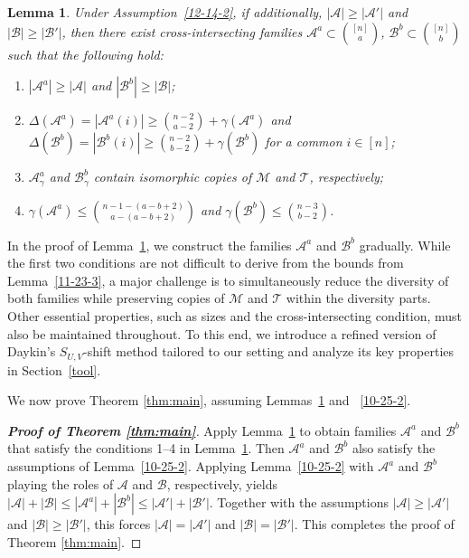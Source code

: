 \documentclass[11pt]{article}
\newcommand{\m}{\mathcal}
\newtheorem{lemma}[theorem]{Lemma}
\begin{document}
\begin{lemma}\label{lemmain}
Under Assumption~\ref{12-14-2}, if additionally, $|\m A|\ge |\m A'|$ and $|\m B|\ge |\m B'|$, then there exist cross-intersecting families $\m A^a\subset {[n]\choose a}$, $\m B^b\subset {[n]\choose b}$ such that the following hold:
\begin{enumerate}
\item $|\m A^a|\ge |\m A|$ and $ |\m B^b|\ge |\m B|$;
\item  $\Delta(\mathcal{A}^a)=|\m A^a(i)|\ge {n-2\choose a-2}+\gamma(\mathcal{A}^a)$ and   $\Delta(\mathcal{B}^b)=|\m B^b(i)|\ge {n-2\choose b-2}+\gamma(\mathcal{B}^b)$ for a common $i\in [n]$;
\item $\m A^a_\gamma$ and $\m B^b_\gamma$  contain isomorphic copies of $\m M$ and $\m T$, respectively;
\item $\gamma(\m A^a)\le {n-1-(a-b+2)\choose a-(a-b+2)}$ and $\gamma(\m B^b)\le {n-3\choose b-2}$.
\end{enumerate}
\end{lemma}

In the proof of Lemma~\ref{lemmain}, we construct the families $\m A^a$ and $\m B^b$ gradually. 
While the first two conditions are not difficult to derive from the bounds from Lemma~\ref{11-23-3}, 
a major challenge is to simultaneously reduce the diversity of both families while preserving copies of $\m M$ and $\m T$ within the diversity parts. Other essential properties, such as sizes and the cross-intersecting condition, must also be maintained throughout.
To this end, we introduce a refined version of Daykin's $S_{U,V}$-shift method tailored to our setting and analyze its key properties in Section~\ref{tool}.

We now prove Theorem \ref{thm:main}, assuming Lemmas~\ref{lemmain} and ~\ref{10-25-2}.
\begin{proof}[{\bf Proof of Theorem \ref{thm:main}}]
Apply Lemma~\ref{lemmain} to obtain families $\m A^a$ and $\m B^b$ that satisfy the conditions 1--4 in Lemma~\ref{lemmain}. 
Then $\m A^a$ and $\m B^b$ also satisfy the assumptions of Lemma~\ref{10-25-2}. Applying Lemma~\ref{10-25-2} with $\m A^a$ and $\m B^b$ playing the roles of $\m A$ and $\m B$, respectively, yields $|\m A|+|\m B|\le |\m A^a|+|\m B^b|\le |\m A'|+|\m B'|$.
Together with the assumptions $|\m A|\ge |\m A'|$ and $|\m B|\ge |\m B'|$, this forces $|\m A|=|\m A'|$ and $|\m B|=|\m B'|$.
This completes the proof of Theorem \ref{thm:main}. 
\end{proof}
\end{document}

